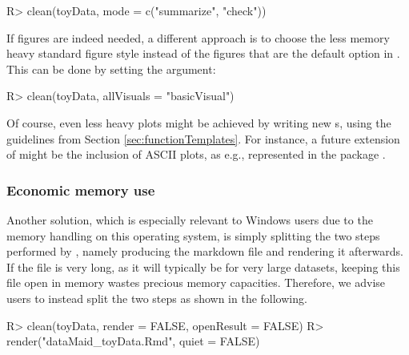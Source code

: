 \documentclass[article,shortnames]{jss}
\newcommand{\hl}[1]{\textcolor{magenta}{#1}}
\begin{document}
\begin{Schunk}
\begin{Sinput}
R> clean(toyData, mode = c("summarize", "check"))
\end{Sinput}
\end{Schunk}

If figures are indeed needed, a different approach is to choose the
less memory heavy standard  figure style instead of the
 figures that are the default option in . This
can be done by setting the  argument:

\begin{Schunk}
\begin{Sinput}
R> clean(toyData, allVisuals = "basicVisual")
\end{Sinput}
\end{Schunk}

Of course, even less heavy plots might be achieved by writing new
s, using the guidelines from Section
\ref{sec:functionTemplates}. For instance, a future extension of
 might be the inclusion of ASCII plots, as
e.g., represented in the  package  \citep{txtplot}.


\subsubsection{Economic memory use}
Another solution, which is
especially relevant to Windows users due to %
the memory handling on this operating system,
is simply splitting the two steps performed
by , namely producing the  markdown file and rendering it
afterwards. If the  file is very long, as it will
typically be for very large datasets, keeping this file open in memory
wastes precious memory capacities. Therefore, we advise users to
instead split the two steps as shown in the following.

\begin{Schunk}
\begin{Sinput}
R> clean(toyData, render = FALSE, openResult = FALSE)
R> render("dataMaid_toyData.Rmd", quiet = FALSE)
\end{Sinput}
\end{Schunk}
\end{document}
